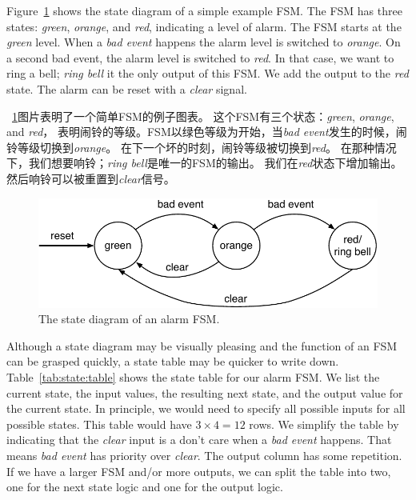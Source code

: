 \documentclass[%
    10pt,
    headinclude, footexclude,
    openright, %
    notitlepage,
    cleardoubleempty,
    headsepline,
    pointlessnumbers,
    bibtotoc, idxtotoc,
    ]{scrbook}
\newcommand{\scale}{0.7}
\begin{document}
Figure~\ref{fig:diag-moore} shows the state diagram of a simple example FSM.
The FSM has three states: \emph{green}, \emph{orange}, and \emph{red},
indicating a level of alarm. The FSM starts at the \emph{green} level.
When a \emph{bad event} happens the alarm level is switched to \emph{orange}.
On a second bad event, the alarm level is switched to \emph{red}.
In that case, we want to ring a bell; \emph{ring bell} it the only output of this FSM.
We add the output to the \emph{red} state.
The alarm can be reset with a \emph{clear} signal.

~\ref{fig:diag-moore}图片表明了一个简单FSM的例子图表。
这个FSM有三个状态：\emph{green}, \emph{orange}, and \emph{red}，
表明闹铃的等级。FSM以绿色等级为开始，当\emph{bad event}发生的时候，闹铃等级切换到\emph{orange}。
在下一个坏的时刻，闹铃等级被切换到\emph{red}。
在那种情况下，我们想要响铃；\emph{ring bell}是唯一的FSM的输出。
我们在\emph{red}状态下增加输出。
然后响铃可以被重置到\emph{clear}信号。

\begin{figure}
  \centering
  \includegraphics[scale=\scale]{figures/state-diag-moore}
  \caption{The state diagram of an alarm FSM.}
  \label{fig:diag-moore}
\end{figure}

Although a state diagram may be visually pleasing and the function of an FSM
can be grasped quickly, a state table may be quicker to write down.
Table~\ref{tab:state:table} shows the state table for our alarm FSM.
We list the current state, the input values, the resulting next state, and
the output value for the current state. In principle, we would need to
specify all possible inputs for all possible states. This table would have
$3 \times 4 = 12$ rows. We simplify the table by indicating that the \emph{clear}
input is a don't care when a \emph{bad event} happens. That means
\emph{bad event} has priority over \emph{clear}. The output column
has some repetition. If we have a larger FSM and/or more outputs, we
can split the table into two, one for the next state logic and one for the
output logic.
\end{document}
